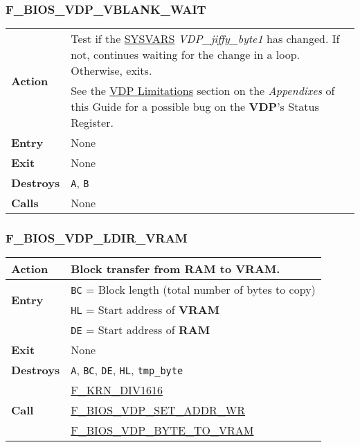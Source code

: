         \subsubsection{F\_BIOS\_VDP\_VBLANK\_WAIT}
        \label{func:fbiosvdpvblankwait}
        \begin{tabular}{l p{9cm}}
            \hline\multirow[t]{2}{4em}{\textbf{Action}}
            & Test if the \hyperref[sec:ram_memmap]{SYSVARS}
            \textit{VDP\_jiffy\_byte1} has changed. If not, continues waiting
            for the change in a loop. Otherwise, exits.\\
            & See the \hyperref[subsec:vdp_limitations]{VDP Limitations} section
            on the \textit{Appendixes} of this Guide for a possible bug on the
            \textbf{VDP}'s Status Register.\\
            \hline\textbf{Entry} & None\\
            \hline\textbf{Exit} & None\\
            \hline\textbf{Destroys} & \texttt{A}, \texttt{B}\\
            \hline\textbf{Calls} & None\\
            \hline
        \end{tabular}

        \subsubsection{F\_BIOS\_VDP\_LDIR\_VRAM}
        \label{func:fbiosvdpldirvram}
        \begin{tabular}{l p{9cm}}
            \hline\textbf{Action}
            & Block transfer from \textbf{RAM} to \textbf{VRAM}.\\
            \hline\multirow[t]{2}{4em}{\textbf{Entry}} & \texttt{BC} = Block 
            length (total number of bytes to copy)\\
            & \texttt{HL} = Start address of \textbf{VRAM}\\
            & \texttt{DE} = Start address of \textbf{RAM}\\
            \hline\textbf{Exit} & None\\
            \hline\textbf{Destroys} & \texttt{A}, \texttt{BC}, \texttt{DE},
            \texttt{HL}, \texttt{tmp\_byte}\\
            \hline\multirow[t]{3}{4em}{\textbf{Call}}
            & \hyperref[func:fkrndiv1616]{F\_KRN\_DIV1616}\\
            & \hyperref[func:fbiosvdpsetaddrwr]{F\_BIOS\_VDP\_SET\_ADDR\_WR}\\
            & \hyperref[func:fbiosvdpbytetovram]{F\_BIOS\_VDP\_BYTE\_TO\_VRAM}\\
            \hline
        \end{tabular}

